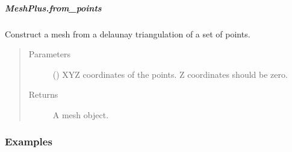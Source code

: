 \documentclass[letterpaper,10pt,english]{sphinxmanual}
\begin{document}
\begin{fulllineitems}
\begin{fulllineitems}
\begin{sphinxVerbatim}[commandchars=\\\{\}]
\end{sphinxVerbatim}

\end{fulllineitems}



\subparagraph{MeshPlus.from\_points}
\label{\detokenize{api/generated/directional_clustering.mesh.MeshPlus.from_points:meshplus-from-points}}\label{\detokenize{api/generated/directional_clustering.mesh.MeshPlus.from_points::doc}}

\begin{fulllineitems}
\label{\detokenize{api/generated/directional_clustering.mesh.MeshPlus.from_points:directional_clustering.mesh.MeshPlus.from_points}}
Construct a mesh from a delaunay triangulation of a set of points.
\begin{quote}\begin{description}
\item[{Parameters}] \leavevmode
{} () \textendash{} XYZ coordinates of the points.
Z coordinates should be zero.

\item[{Returns}] \leavevmode
{} \textendash{} A mesh object.

\end{description}\end{quote}
\subsubsection*{Examples}

\begin{sphinxVerbatim}[commandchars=\\\{\}]
\end{sphinxVerbatim}

\end{fulllineitems}




\end{fulllineitems}
\end{document}
